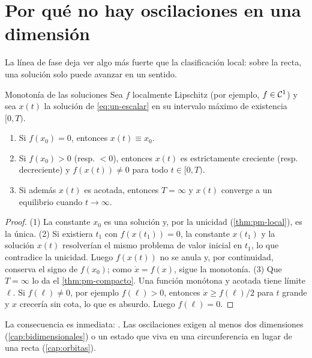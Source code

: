 \section{Por qué no hay oscilaciones en una dimensión}
\label{sec:un-monotonia}

La línea de fase deja ver algo más fuerte que la clasificación local: sobre la recta, una solución solo puede avanzar en un sentido.

\begin{proposicion}[label=prop:un-monotonia]{Monotonía de las soluciones}
Sea $f$ localmente Lipschitz (por ejemplo, $f\in\mathcal{C}^{1}$) y sea $x(t)$ la solución de \eqref{eq:un-escalar} en su intervalo máximo de existencia $[0,T)$.
\begin{enumerate}
  \item Si $f(x_0)=0$, entonces $x(t)\equiv x_0$.
  \item Si $f(x_0)>0$ (resp. $<0$), entonces $x(t)$ es estrictamente creciente (resp. decreciente) y $f(x(t))\neq0$ para todo $t\in[0,T)$.
  \item Si además $x(t)$ es acotada, entonces $T=\infty$ y $x(t)$ converge a un equilibrio cuando $t\to\infty$.
\end{enumerate}
\end{proposicion}

\begin{proof}
(1) La constante $x_0$ es una solución y, por la unicidad (\cref{thm:pm-local}), es la única. (2) Si existiera $t_1$ con $f(x(t_1))=0$, la constante $x(t_1)$ y la solución $x(t)$ resolverían el mismo problema de valor inicial en $t_1$, lo que contradice la unicidad. Luego $f(x(t))$ no se anula y, por continuidad, conserva el signo de $f(x_0)$; como $\dot x=f(x)$, sigue la monotonía. (3) Que $T=\infty$ lo da el \cref{thm:pm-compacto}. Una función monótona y acotada tiene límite $\ell$. Si $f(\ell)\neq0$, por ejemplo $f(\ell)>0$, entonces $\dot x\ge f(\ell)/2$ para $t$ grande y $x$ crecería sin cota, lo que es absurdo. Luego $f(\ell)=0$.
\end{proof}

La consecuencia es inmediata: . Las oscilaciones exigen al menos dos dimensiones (\cref{cap:bidimensionales}) o un estado que viva en una circunferencia en lugar de una recta (\cref{cap:orbitas}).

